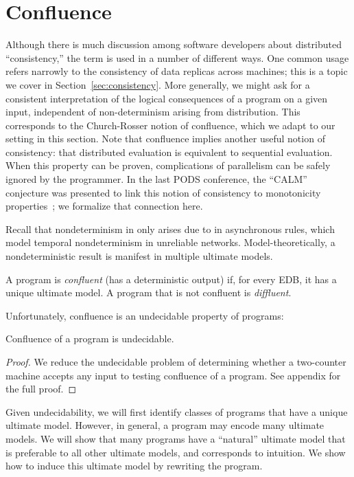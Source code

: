 \section{Confluence}
\label{sec:confluence}
Although there is much discussion among software developers about distributed ``consistency,'' the term is used in a number of different ways.  One common usage refers narrowly to the consistency of data replicas across machines; this is a topic we cover in Section~\ref{sec:consistency}.  More generally, we might ask for a consistent interpretation of the logical consequences of a program on a given input, independent of non-determinism arising from distribution. 
This corresponds to the Church-Rosser notion of confluence, which we adapt to our setting in this section.  Note that confluence implies another useful notion of consistency: that distributed evaluation is equivalent to sequential evaluation.  When this property can be proven, complications of parallelism can be safely ignored by the programmer.  In the last PODS conference, the ``CALM'' conjecture was presented to link this notion of consistency to monotonicity properties~\cite{declarative-imperative}; we formalize that connection here. 

Recall that nondeterminism in \lang only arises due to  in asynchronous rules, 
which model temporal nondeterminism in unreliable networks.
Model-theoretically, a nondeterministic result is manifest in multiple ultimate models.

\begin{definition}
A \lang program is {\em confluent} (has a deterministic output) if, for every EDB, it has a unique ultimate model.  A program that is not confluent is {\em diffluent}.
\end{definition}

Unfortunately, confluence is an undecidable property of \lang programs:

\begin{lemma}
\label{lem:confluence-undecidable}
Confluence of a \lang program is undecidable.
\end{lemma}
\begin{proof}
We reduce the undecidable problem of determining whether a two-counter machine accepts any input to testing confluence of a \lang program.  See appendix for the full proof.
\end{proof}

Given undecidability, we will first identify classes of programs that have a unique ultimate model.  However, in general, a \lang program may encode many ultimate models.  We will show that many \lang programs have a ``natural'' ultimate model that is preferable to all other ultimate models, and corresponds to intuition.  We show how to induce this ultimate model by rewriting the program.

